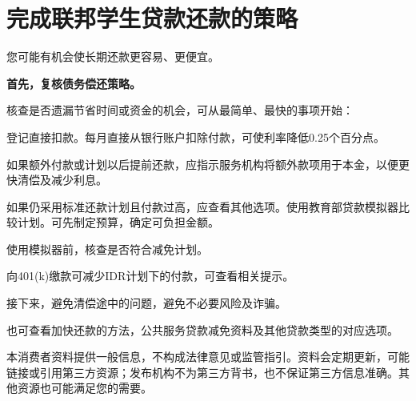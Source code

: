 \documentclass[UTF8,fontset=none,11pt,a4paper]{ctexart}
\begin{document}
\section*{完成联邦学生贷款还款的策略}
您可能有机会使长期还款更容易、更便宜。


\textbf{首先，复核债务偿还策略。}


核查是否遗漏节省时间或资金的机会，可从最简单、最快的事项开始：


登记直接扣款。每月直接从银行账户扣除付款，可使利率降低0.25个百分点。


如果额外付款或计划以后提前还款，应指示服务机构将额外款项用于本金，以便更快清偿及减少利息。


如果仍采用标准还款计划且付款过高，应查看其他选项。使用教育部贷款模拟器比较计划。可先制定预算，确定可负担金额。


使用模拟器前，核查是否符合减免计划。


向401(k)缴款可减少IDR计划下的付款，可查看相关提示。


接下来，避免清偿途中的问题，避免不必要风险及诈骗。


也可查看加快还款的方法，公共服务贷款减免资料及其他贷款类型的对应选项。


本消费者资料提供一般信息，不构成法律意见或监管指引。资料会定期更新，可能链接或引用第三方资源；发布机构不为第三方背书，也不保证第三方信息准确。其他资源也可能满足您的需要。
\end{document}
